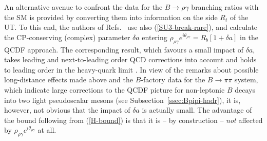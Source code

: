 \documentclass[11pt]{cernrep}
\begin{document}
An alternative avenue to confront the data for the $B\to \rho\gamma$
branching ratios with the SM is provided by converting them into information
on the side $R_t$ of the UT. To this end, the authors of Refs.~\cite{ALP-rare,BoBu}
use also (\ref{SU3-break-rare}), and calculate the CP-conserving (complex) 
parameter $\delta a$ entering 
$\rho_{\rho\gamma}e^{i\theta_{\rho\gamma}}=R_b\left[1+\delta a\right]$
in the QCDF approach. The corresponding result, which favours a small impact 
of $\delta a$, takes leading and next-to-leading order QCD corrections into 
account and holds to leading order in the heavy-quark limit \cite{BoBu}. 
In view of the remarks about possible long-distance effects made above and the 
$B$-factory data for the $B\to\pi\pi$ system, which indicate large corrections 
to the QCDF picture for non-leptonic $B$ decays into two light pseudoscalar 
mesons (see Subsection~\ref{ssec:Bpipi-hadr}), it is, however, not obvious that 
the impact of $\delta a$ is actually small. The advantage of the bound
following from (\ref{H-bound}) is that it is  -- by construction -- {\it not} affected 
by $\rho_{\rho\gamma}e^{i\theta_{\rho\gamma}}$ at all.



%
%
%
\boldmath
\end{document}
